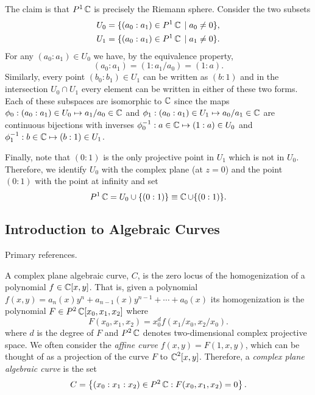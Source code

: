 The claim is that $P^1\operatorname{\mathbb{C}}$ is precisely the Riemann sphere. Consider the
two subsets
\begin{align*}
    U_0 &= \{ (a_0 : a_1) \in P^1\operatorname{\mathbb{C}} \; | \; a_0 \neq 0 \}, \\
    U_1 &= \{ (a_0 : a_1) \in P^1\operatorname{\mathbb{C}} \; | \; a_1 \neq 0 \}.
\end{align*}
For any $(a_0 : a_1) \in U_0$ we have, by the equivalence property,
\[
    (a_0 : a_1) = (1 : a_1/a_0) = (1 : a).
\]
Similarly, every point $(b_0 : b_1) \in U_1$ can be written as $(b : 1)$
and in the intersection $U_0 \cap U_1$ every element can be written in
either of these two forms. Each of these subspaces are isomorphic to
$\operatorname{\mathbb{C}}$ since the maps $\phi_0 : (a_0 : a_1) \in U_0 \mapsto a_1 / a_0 \in
\operatorname{\mathbb{C}}$ and $\phi_1 : (a_0 : a_1) \in U_1 \mapsto a_0 / a_1 \in \operatorname{\mathbb{C}}$ are
continuous bijections with inverses $\phi^{-1}_0 : a \in \operatorname{\mathbb{C}} \mapsto (1
: a) \in U_0$ and $\phi^{-1}_1 : b \in \operatorname{\mathbb{C}} \mapsto (b : 1) \in U_1$.

Finally, note that $(0 : 1)$ is the only projective point in $U_1$ which
is not in $U_0$. Therefore, we identify $U_0$ with the complex plane (at
$z=0$) and the point $(0 : 1)$ with the point at infinity and set
\begin{equation}
  P^1\operatorname{\mathbb{C}} = U_0 \cup \{ (0 : 1) \} \equiv \operatorname{\mathbb{C}} \cup \{(0 : 1)\}.
\end{equation}


\subsection{Introduction to Algebraic Curves}

Primary references. \cite{Griffiths89, Ueno97}

A complex plane algebraic curve, $C$, is the zero locus of the
homogenization of a polynomial $f \in \operatorname{\mathbb{C}}[x,y]$. That is, given a
polynomial $f(x,y) = a_n(x) y^n + a_{n-1}(x)y^{n-1} + \cdots + a_0(x)$
its homogenization is the polynomial $F \in P^2\operatorname{\mathbb{C}}[x_0,x_1,x_2]$ where
\[
  F(x_0,x_1,x_2) = x_0^d f(x_1/x_0,x_2/x_0).
\]
where $d$ is the degree of $F$ and $P^2\operatorname{\mathbb{C}}$ denotes two-dimensional
complex projective space. We often consider the {\it affine curve}
$f(x,y) = F(1,x,y)$, which can be thought of as a projection of the
curve $F$ to $\operatorname{\mathbb{C}}^2[x,y]$. Therefore, a {\it complex plane algebraic
  curve} is the set
\[
  C = \left\{
  (x_0 : x_1 : x_2) \in P^2\operatorname{\mathbb{C}} : F(x_0,x_1,x_2) = 0
  \right\}.
\]

